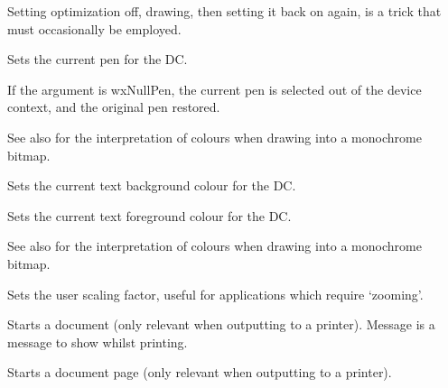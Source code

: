 Setting optimization off, drawing, then setting it back on again, is a trick
that must occasionally be employed.


\label{wxdcsetpen}


Sets the current pen for the DC.

If the argument is wxNullPen, the current pen is selected out of the device
context, and the original pen restored.

See also  for the interpretation of colours
when drawing into a monochrome bitmap.


\label{wxdcsettextbackground}


Sets the current text background colour for the DC.


\label{wxdcsettextforeground}


Sets the current text foreground colour for the DC.

See also  for the interpretation of colours
when drawing into a monochrome bitmap.


\label{wxdcsetuserscale}


Sets the user scaling factor, useful for applications which require
`zooming'.


\label{wxdcstartdoc}


Starts a document (only relevant when outputting to a printer).
Message is a message to show whilst printing.


\label{wxdcstartpage}


Starts a document page (only relevant when outputting to a printer).

\section{}\label{wxdcclipper}

